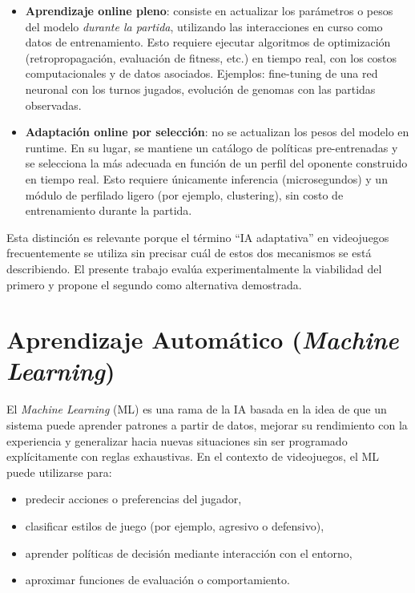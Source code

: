 \begin{itemize}
    \item \textbf{Aprendizaje online pleno}: consiste en actualizar los parámetros o pesos del modelo \textit{durante la partida}, utilizando las interacciones en curso como datos de entrenamiento. Esto requiere ejecutar algoritmos de optimización (retropropagación, evaluación de fitness, etc.) en tiempo real, con los costos computacionales y de datos asociados. Ejemplos: fine-tuning de una red neuronal con los turnos jugados, evolución de genomas con las partidas observadas.

    \item \textbf{Adaptación online por selección}: no se actualizan los pesos del modelo en runtime. En su lugar, se mantiene un catálogo de políticas pre-entrenadas y se selecciona la más adecuada en función de un perfil del oponente construido en tiempo real. Esto requiere únicamente inferencia (microsegundos) y un módulo de perfilado ligero (por ejemplo, clustering), sin costo de entrenamiento durante la partida.
\end{itemize}

Esta distinción es relevante porque el término ``IA adaptativa'' en videojuegos frecuentemente se utiliza sin precisar cuál de estos dos mecanismos se está describiendo. El presente trabajo evalúa experimentalmente la viabilidad del primero y propone el segundo como alternativa demostrada.

\section{Aprendizaje Automático (\textit{Machine Learning})}

El \textit{Machine Learning} (ML) es una rama de la IA basada en la idea de que un sistema puede aprender patrones a partir de datos, mejorar su rendimiento con la experiencia y generalizar hacia nuevas situaciones sin ser programado explícitamente con reglas exhaustivas. En el contexto de videojuegos, el ML puede utilizarse para:

\begin{itemize}
    \item predecir acciones o preferencias del jugador,
    \item clasificar estilos de juego (por ejemplo, agresivo o defensivo),
    \item aprender políticas de decisión mediante interacción con el entorno,
    \item aproximar funciones de evaluación o comportamiento.
\end{itemize}

